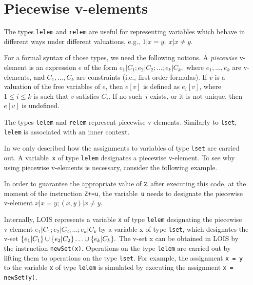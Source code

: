 \section{Piecewise v-elements} \label{app_piecewise}
The types \verb-lelem- and \verb-relem- %
 are useful for representing variables which behave in different ways under different valuations, e.g., $1|x=y;\ x|x\neq y.$

For a formal syntax of those types,  we  need the following notions.
A \emph{piecewise} v-element is an expression $e$ of the form
$e_1|C_1;e_2|C_2;\ldots; e_k|C_k,$
where $e_1,\ldots,e_k$ are v-elements, and $C_1,\ldots,C_k$ are constraints (i.e., first order formulas).
If $v$ is a valuation of the free variables of $e$,
then $e[v]$ is defined as $e_i[v]$, where $1\le i\le k$ is such that
$v$ satisfies $C_i$. If no such~$i$ exists, or it is not unique, then $e[v]$ is undefined.

The types {\tt lelem} and {\tt relem} represent piecewise v-elements.
Similarly to {\tt lset}, {\tt lelem} is associated with an inner context.

In \cite{lois-sem}
we only described how the assignments to variables of type {\tt lset} are carried out. A variable~{\tt x} of type {\tt lelem} designates a piecewise v-element.
 To see why using piecewise v-elements is necessary, consider the following example.

In order to guarantee the appropriate value of $\tt Z$ after executing this code, at the moment of the instruction \mbox{\tt Z+=u}, the variable~{\tt u}
needs to designate the piecewise v-element
$x|x=y; (x,y)|x\neq y.$

Internally, LOIS represents a variable {\tt x} of type {\tt lelem} designating the piecewise v-element $e_1|C_1;e_2|C_2;\ldots;e_k|C_k$
 by a variable \bra x of type {\tt lset}, which designates the v-set
 $\{e_1|C_1\}\cup\{e_2|C_2\}\ldots\cup\{e_k|C_k\}.$
 The v-set \bra x can be obtained in LOIS by the instruction {\tt newSet(x)}.
Operations on the type {\tt lelem} are carried out by lifting them to operations on the type {\tt lset}. For example,
the assignment {\tt x = y} to the variable {\tt x} of type {\tt lelem} is simulated by executing the assignment {\tt\bra x = newSet(y)}.

